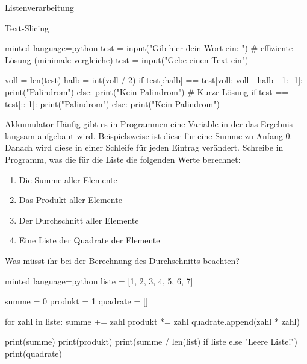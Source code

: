 \begin{task}[points=auto]{Listenverarbeitung}
\begin{subtask*}[points=0]{Text-Slicing }
        \begin{solution}
            \begin{codeBlock}[]{minted language=python}
                test = input("Gib hier dein Wort ein: ")
                # effiziente Lösung (minimale vergleiche)
                test = input("Gebe einen Text ein")

                voll = len(test)
                halb = int(voll / 2)
                if test[:halb] == test[voll: voll - halb - 1: -1]:
                    print("Palindrom")
                else:
                    print("Kein Palindrom")
                # Kurze Lösung
                if test == test[::-1]:
                    print("Palindrom")
                else:
                    print("Kein Palindrom")
            \end{codeBlock}
        \end{solution}
    \end{subtask*}
    \begin{subtask*}[points=0]{Akkumulator }
        Häufig gibt es in Programmen eine Variable in der das Ergebnis langsam aufgebaut
        wird. Beispielsweise ist diese für eine Summe zu Anfang $0$. Danach wird diese
        in einer Schleife für jeden Eintrag verändert. Schreibe in Programm, was die
        für die Liste \pythoninline{[1, 2, 3, 4, 5, 6, 7]} die folgenden Werte berechnet:

        \begin{enumerate}
            \item Die Summe aller Elemente
            \item Das Produkt aller Elemente
            \item Der Durchschnitt aller Elemente
            \item Eine Liste der Quadrate der Elemente
        \end{enumerate}

        Was müsst ihr bei der Berechnung des Durchschnitts beachten?

        \begin{solution}
            \begin{codeBlock}[]{minted language=python}
                liste = [1, 2, 3, 4, 5, 6, 7]

                summe = 0
                produkt = 1
                quadrate = []

                for zahl in liste:
                    summe += zahl
                    produkt *= zahl
                    quadrate.append(zahl * zahl)

                print(summe)
                print(produkt)
                print(summe / len(list) if liste else "Leere Liste!")
                print(quadrate)
            \end{codeBlock}
        \end{solution}
    \end{subtask*}
\end{task}

